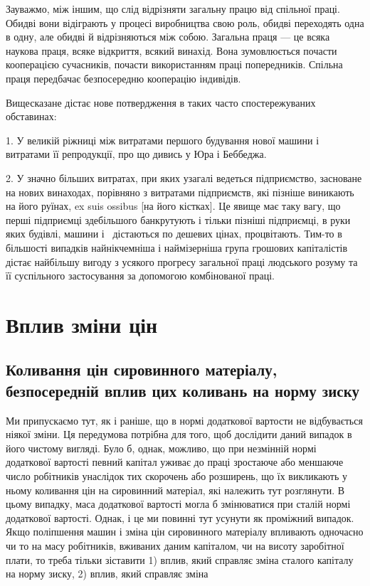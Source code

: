 Зауважмо, між іншим, що слід відрізняти загальну працю від
спільної праці. Обидві вони відіграють у процесі виробництва
свою роль, обидві переходять одна в одну, але обидві й
відрізняються між собою. Загальна праця — це всяка наукова
праця, всяке відкриття, всякий винахід. Вона зумовлюється почасти кооперацією сучасників, почасти
використанням праці попередників. Спільна праця передбачає безпосередню кооперацію індивідів.

Вищесказане дістає нове потвердження в таких часто спостережуваних обставинах:

1. У великій ріжниці між витратами першого будування нової
машини і витратами її репродукції, про що дивись у Юра
і Беббеджа.

2. У значно більших витратах, при яких узагалі ведеться підприємство, засноване на нових винаходах,
порівняно з витратами
підприємств, які пізніше виникають на його руїнах, ex suis ossibus
[на його кістках]. Це явище має таку вагу, що перші
підприємці здебільшого банкрутують і тільки пізніші підприємці,
в руки яких будівлі, машини і~ дістаються по дешевих цінах, процвітають. Тим-то в більшості
випадків найнікчемніша
і наймізерніша група грошових капіталістів дістає найбільшу
вигоду з усякого прогресу загальної праці людського розуму та
її суспільного застосування за допомогою комбінованої праці.

\section{Вплив зміни цін}

\subsection{Коливання цін сировинного матеріалу, безпосередній вплив цих коливань на норму зиску}

Ми припускаємо тут, як і раніше, що в нормі додаткової
вартости не відбувається ніякої зміни. Ця передумова потрібна
для того, щоб дослідити даний випадок в його чистому вигляді.
Було б, однак, можливо, що при незмінній нормі додаткової вартості певний капітал уживає до праці
зростаюче або меншаюче число робітників унаслідок тих скорочень або розширень, що їх викликають у
ньому коливання цін на сировинний матеріал, які належить тут розглянути. В цьому випадку,
маса додаткової вартості могла б змінюватися при сталій нормі
додаткової вартості. Однак, і це ми повинні тут усунути
як проміжний випадок. Якщо поліпшення машин і зміна цін
сировинного матеріалу впливають одночасно чи то на масу
робітників, вживаних даним капіталом, чи на висоту заробітної
плати, то треба тільки зіставити 1) вплив, який справляє зміна
сталого капіталу на норму зиску, 2) вплив, який справляє зміна
\parbreak{}  %
